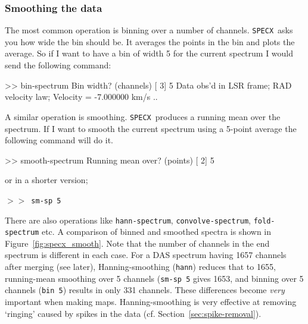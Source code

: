 \documentclass[11pt,twoside]{starlink}
\providecommand{\SPECX}{\texttt{SPECX}}
\providecommand{\SP}{{$>\!>$}}
\begin{document}
\subsubsection{Smoothing the data}
\label{sec:specx_binning}
The most common operation is binning over a number of channels.
\SPECX\ asks you how wide the bin should be. It averages the points in
the bin and plots the average.  So if I want to have a bin of width 5 for
the current spectrum I would send the following command:

\begin{terminalv}
>> bin-spectrum
Bin width? (channels) [  3] 5
Data obs'd in LSR  frame; RAD velocity law; Velocity =   -7.000000     km/s
..
\end{terminalv}

A similar operation is smoothing.  \SPECX\ produces a running mean
over the spectrum.  If I want to smooth the current spectrum using a
5-point average the following command will do it.

\begin{terminalv}
>> smooth-spectrum
Running mean over? (points) [ 2] 5
\end{terminalv}

or in a shorter version;

\SP\ \verb|sm-sp 5 |

There are also operations like \texttt{hann-spectrum}, \texttt{convolve-spectrum}, \texttt{fold-spectrum} etc. A comparison of binned
and smoothed spectra is shown in Figure~\ref{fig:specx_smooth}. Note
that the number of channels in the end spectrum is different in each
case. For a DAS spectrum having 1657 channels after merging (see
later), Hanning-smoothing ({\tt{hann}}) reduces that to 1655,
running-mean smoothing over 5 channels ({\tt{sm-sp 5}} gives 1653, and
binning over 5 channels ({\tt{bin 5}}) results in only 331
channels. These differences become \textit{very} important when making
maps. Hanning-smoothing is very effective at removing `ringing' caused
by spikes in the data (cf. Section~\ref{sec:spike-removal}).
\end{document}
